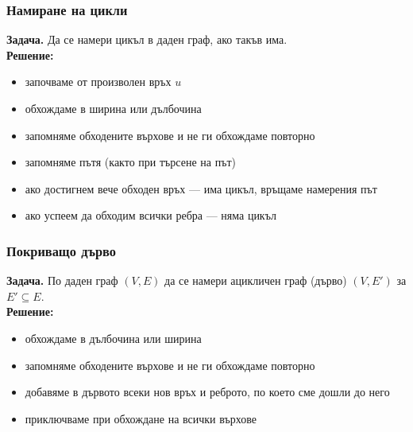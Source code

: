 \documentclass{beamer}
\begin{document}
\begin{frame}
  \frametitle{Намиране на цикли}
  \textbf{Задача. }Да се намери цикъл в даден граф, ако такъв има.\\
  \pause
  \textbf{Решение:}\\
  \begin{itemize}[<+->]
  \item започваме от произволен връх $u$
  \item обхождаме в ширина или дълбочина
  \item запомняме обходените върхове и не ги обхождаме повторно
  \item запомняме пътя (както при търсене на път)
  \item ако достигнем вече обходен връх --- има цикъл, връщаме намерения път
  \item ако успеем да обходим всички ребра --- няма цикъл
  \end{itemize}
\end{frame}

\begin{frame}
  \frametitle{Покриващо дърво}
  \textbf{Задача. }По даден граф $(V,E)$ да се намери ацикличен граф (дърво) $(V,E')$ за $E' \subseteq E$.\\
  \pause
  \textbf{Решение:}\\
  \begin{itemize}[<+->]
  \item обхождаме в дълбочина или ширина
  \item запомняме обходените върхове и не ги обхождаме повторно
  \item добавяме в дървото всеки нов връх и реброто, по което сме дошли до него
  \item приключваме при обхождане на всички върхове
  \end{itemize}
\end{frame}
\end{document}
